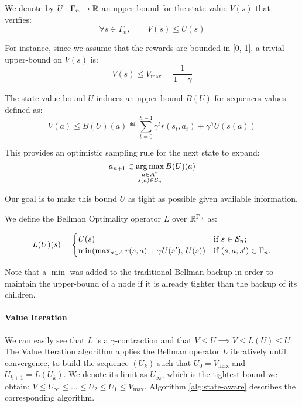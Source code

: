 \documentclass{article}
\begin{document}
\begin{definition}

We denote by $U:\Gamma_n \rightarrow \mathbb{R}$ an upper-bound for the state-value $V(s)$ that verifies:
\begin{equation*}
    \forall s\in\Gamma_n, \qquad V(s) \leq U(s)
\end{equation*}

For instance, since we assume that the rewards are bounded in [0, 1], a trivial upper-bound on $V(s)$ is:
\[V(s) \leq V_{\max} = \frac{1}{1-\gamma} \]

The state-value bound $U$ induces an upper-bound $B(U)$ for sequences values defined as:
\begin{equation}
\label{eq:sequence_value}
    V(a) \leq B(U)(a) \eqdef \sum_{t=0}^{h-1} \gamma^t r(s_t, a_t) + \gamma^{h} U(s(a))
\end{equation}
\end{definition}

This provides an optimistic sampling rule for the next state to expand:
\begin{equation}
    \label{eq:sampling_rule}
    a_{n+1} \in \operatorname*{arg\,max}_{\substack{a\in A^*\\s(a)\in\mathcal{S}_n}} B(U)(a)
\end{equation}

Our goal is to make this bound $U$ as tight as possible given available information.

\begin{definition}
We define the Bellman Optimality operator $L$ over $\mathbb{R}^{\Gamma_n}$ as:

\begin{equation}
    L(U)(s) = \begin{cases}
    U(s) & \text{if $s\in\mathcal{S}_n$;} \\
    \min(\max_{a\in A} r(s,a) + \gamma U({s'}),\, U(s))
    & \text{if $(s,a,s')\in\Gamma_n$.}
    \end{cases}
\end{equation}

Note that a $\min$ was added to the traditional Bellman backup in order to maintain the upper-bound of a node if it is already  tighter than the backup of its children.
\end{definition}

\paragraph{Value Iteration}
We can easily see that $L$ is a $\gamma$-contraction and that
$
    V \leq U \implies V \leq L(U) \leq U.
$
The Value Iteration algorithm applies the Bellman operator $L$ iteratively until convergence, to build the sequence $(U_k)$ such that $U_0 = V_{\max}$ and $U_{k+1} = L(U_k)$. We denote its limit as $U_\infty$, which is the tightest bound we obtain: $V\leq U_\infty\leq\dots\leq U_2 \leq U_1\leq V_{\max}$.
Algorithm \ref{alg:state-aware} describes the corresponding algorithm.
\end{document}
